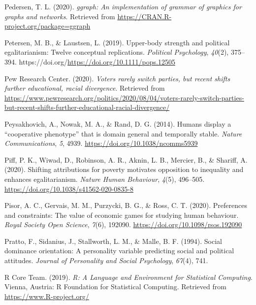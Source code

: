 \documentclass[
  man,floatsintext]{apa6}
\newlength{\cslhangindent}
\newlength{\cslentryspacingunit} %
\newenvironment{CSLReferences}[2] %
 {%
  \setlength{\parindent}{0pt}
  \ifodd #1
  \let\oldpar\par
  \def\par{\hangindent=\cslhangindent\oldpar}
  \fi
  \setlength{\parskip}{#2\cslentryspacingunit}
 }%
 {}
\begin{document}
\begin{CSLReferences}{1}{0}
\leavevmode{}%
Pedersen, T. L. (2020). \emph{{ggraph}: An implementation of grammar of graphics for graphs and networks}. Retrieved from \url{https://CRAN.R-project.org/package=ggraph}

\leavevmode{}%
Petersen, M. B., \& Laustsen, L. (2019). Upper-body strength and political egalitarianism: Twelve conceptual replications. \emph{Political Psychology}, \emph{40}(2), 375--394. https://doi.org/\url{https://doi.org/10.1111/pops.12505}

\leavevmode{}%
Pew Research Center. (2020). \emph{Voters rarely switch parties, but recent shifts further educational, racial divergence}. Retrieved from \url{https://www.pewresearch.org/politics/2020/08/04/voters-rarely-switch-parties-but-recent-shifts-further-educational-racial-divergence/}

\leavevmode{}%
Peysakhovich, A., Nowak, M. A., \& Rand, D. G. (2014). Humans display a {``cooperative phenotype''} that is domain general and temporally stable. \emph{Nature Communications}, \emph{5}, 4939. \url{https://doi.org/10.1038/ncomms5939}

\leavevmode{}%
Piff, P. K., Wiwad, D., Robinson, A. R., Aknin, L. B., Mercier, B., \& Shariff, A. (2020). Shifting attributions for poverty motivates opposition to inequality and enhances egalitarianism. \emph{Nature Human Behaviour}, \emph{4}(5), 496--505. \url{https://doi.org/10.1038/s41562-020-0835-8}

\leavevmode{}%
Pisor, A. C., Gervais, M. M., Purzycki, B. G., \& Ross, C. T. (2020). Preferences and constraints: The value of economic games for studying human behaviour. \emph{Royal Society Open Science}, \emph{7}(6), 192090. \url{https://doi.org/10.1098/rsos.192090}

\leavevmode{}%
Pratto, F., Sidanius, J., Stallworth, L. M., \& Malle, B. F. (1994). Social dominance orientation: A personality variable predicting social and political attitudes. \emph{Journal of Personality and Social Psychology}, \emph{67}(4), 741.

\leavevmode{}%
R Core Team. (2019). \emph{{R: A Language and Environment for Statistical Computing}}. Vienna, Austria: R Foundation for Statistical Computing. Retrieved from \url{https://www.R-project.org/}


\end{CSLReferences}
\end{document}
